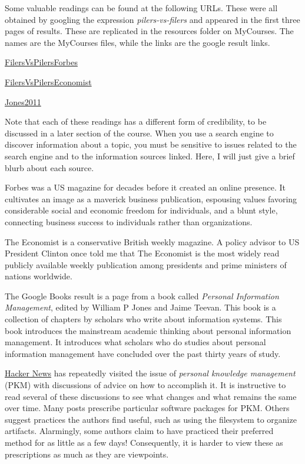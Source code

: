 Some valuable readings can be found at the following URLs. These were
all obtained by googling the expression \emph{pilers-vs-filers} and
appeared in the first three pages of results. These are replicated in
the resources folder on MyCourses. The names are the MyCourses files,
while the links are the google result links.

\href{http://www.forbes.com/sites/bwoo/2013/02/20/are-you-a-filer-or-piler/}{FilersVsPilersForbes}

\href{http://www.economist.com/node/1489224}{FilersVsPilersEconomist}

\href{http://books.google.com/books?id=byN4SPUt6RgC\&pg=PA212\&lpg=PA212\&dq=filers+vs+pilers\&source=bl\&ots=d_4Bm_sAaG\&sig=78Fkf46OjWKAbNb56L3sUKQfULY\&hl=en\&sa=X\&ei=M5PVUu-eNoLmoAS-kYII\&ved=0CEkQ6AEwBDgU\#v=onepage\&q=filers\%20vs\%20pilers\&f=false}{Jones2011}

Note that each of these readings has a different form of credibility, to
be discussed in a later section of the course. When you use a search
engine to discover information about a topic, you must be sensitive to
issues related to the search engine and to the information sources
linked. Here, I will just give a brief blurb about each source.

Forbes was a US magazine for decades before it created an online
presence. It cultivates an image as a maverick business publication,
espousing values favoring considerable social and economic freedom for
individuals, and a blunt style, connecting business success to
individuals rather than organizations.

The Economist is a conservative British weekly magazine. A policy
advisor to US President Clinton once told me that The Economist is the
most widely read publicly available weekly publication among presidents
and prime ministers of nations worldwide.

The Google Books result is a page from a book called \emph{Personal
Information Management}, edited by William P Jones and Jaime Teevan.
This book is a collection of chapters by scholars who write about
information systems. This book introduces the mainstream academic
thinking about personal information management. It introduces what
scholars who do studies about personal information management have
concluded over the past thirty years of study.

\hypertarget{advice-on-pkm}{%
\label{advice-on-pkm}}

\href{https://news.ycombinator.com/item?id=17892731}{Hacker News} has
repeatedly visited the issue of \emph{personal knowledge management}
(PKM) with discussions of advice on how to accomplish it. It is
instructive to read several of these discussions to see what changes and
what remains the same over time. Many posts prescribe particular
software packages for PKM. Others suggest practices the authors find
useful, such as using the filesystem to organize artifacts. Alarmingly,
some authors claim to have practiced their preferred method for as
little as a few days! Consequently, it is harder to view these as
prescriptions as much as they are viewpoints.

